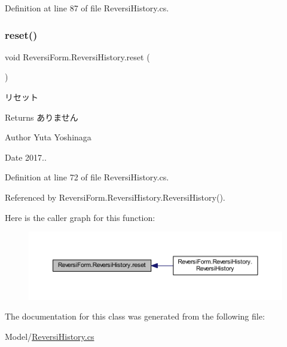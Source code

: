 Definition at line 87 of file Reversi\+History.\+cs.

\mbox{\label{class_reversi_form_1_1_reversi_history_aa86ef20775db0009ddfbed5f813fe2d8}} 
\subsubsection{\texorpdfstring{reset()}{reset()}}
{\footnotesize\ttfamily void Reversi\+Form.\+Reversi\+History.\+reset (\begin{DoxyParamCaption}{ }\end{DoxyParamCaption})}



リセット 

\begin{DoxyReturn}{Returns}
ありません 
\end{DoxyReturn}
\begin{DoxyAuthor}{Author}
Yuta Yoshinaga 
\end{DoxyAuthor}
\begin{DoxyDate}{Date}
2017.. 
\end{DoxyDate}


Definition at line 72 of file Reversi\+History.\+cs.



Referenced by Reversi\+Form.\+Reversi\+History.\+Reversi\+History().

Here is the caller graph for this function\+:
\nopagebreak
\begin{figure}[H]
\begin{center}
\leavevmode
\includegraphics[width=350pt]{class_reversi_form_1_1_reversi_history_aa86ef20775db0009ddfbed5f813fe2d8_icgraph}
\end{center}
\end{figure}


The documentation for this class was generated from the following file\+:\begin{DoxyCompactItemize}
\item 
Model/\hyperlink{_reversi_history_8cs}{Reversi\+History.\+cs}\end{DoxyCompactItemize}
